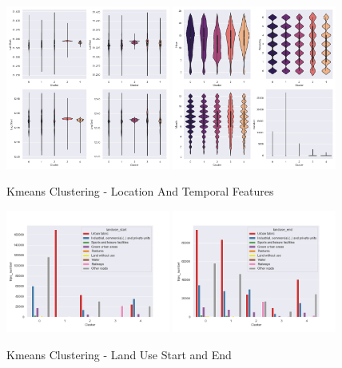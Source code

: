 \begin{figure}[htp]
    \centering
    \includegraphics[width=0.48\textwidth]{figures/Clustering/clusters_lat_start.png}
    \includegraphics[width=0.48\textwidth]{figures/Clustering/clusters_hour.png}
    \caption{Kmeans Clustering - Location And Temporal Features}
    \label{fig:kmeans_loc_temp}
\end{figure}
\begin{figure}[htp]
    \centering
    \includegraphics[width=0.48\textwidth]{figures/Clustering/landuse_start.png}
    \includegraphics[width=0.48\textwidth]{figures/Clustering/landuse_end.png}
    \caption{Kmeans Clustering - Land Use Start and End}
    \label{fig:kmeans_land_use}
\end{figure}
